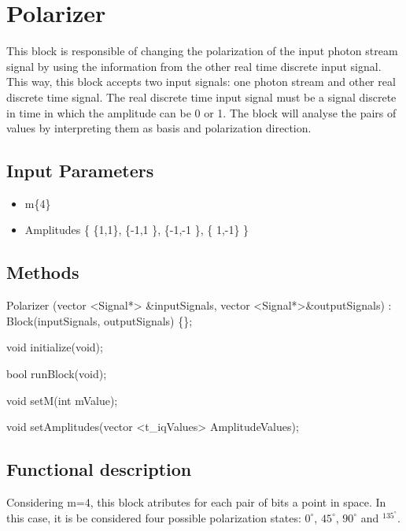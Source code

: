 \clearpage

\section{Polarizer}

\maketitle
This block is responsible of changing the polarization of the input photon stream signal by using the information from the other real time discrete input signal. This way, this block accepts two input signals: one photon stream and other real discrete time signal. The real discrete time input signal must be a signal discrete in time in which the amplitude can be 0 or 1. The block will analyse the pairs of values by interpreting them as basis and polarization direction.


\subsection*{Input Parameters}

	\begin{itemize}
		\item m\{4\}
		\item Amplitudes \{ \{1,1\}, \{-1,1 \}, \{-1,-1 \}, \{ 1,-1\} \}
	\end{itemize}

\subsection*{Methods}

Polarizer (vector <Signal*> \&inputSignals, vector <Signal*>\&outputSignals) : Block(inputSignals, outputSignals) \{\};

void initialize(void);

bool runBlock(void);

void setM(int mValue);

void setAmplitudes(vector <t\_iqValues> AmplitudeValues);


\subsection*{Functional description}
Considering m=4, this block atributes for each pair of bits a point in space. In this case, it is be considered four possible polarization states: $0^\circ$, $45^\circ$, $90^\circ$ and $^135^\circ$.


